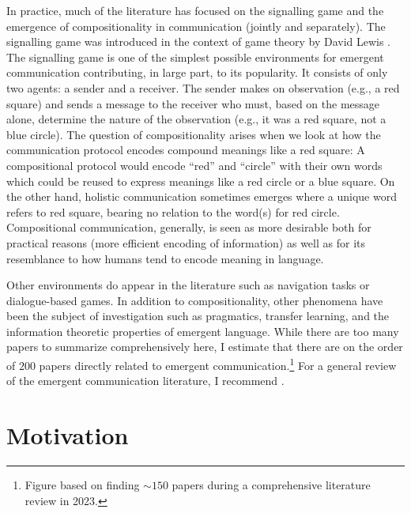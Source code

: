 In practice, much of the literature has focused on the signalling game and the emergence of compositionality in communication (jointly and separately).
The signalling game was introduced in the context of game theory by David Lewis .
The signalling game is one of the simplest possible environments for emergent communication contributing, in large part, to its popularity.
It consists of only two agents: a sender and a receiver.
The sender makes on observation (e.g., a red square) and sends a message to the receiver who must, based on the message alone, determine the nature of the observation (e.g., it was a red square, not a blue circle).
The question of compositionality arises when we look at how the communication protocol encodes compound meanings like a red square: A compositional protocol would encode ``red'' and ``circle'' with their own words which could be reused to express meanings like a red circle or a blue square.
On the other hand, holistic communication sometimes emerges where a unique word refers to red square, bearing no relation to the word(s) for red circle.
Compositional communication, generally, is seen as more desirable both for practical reasons (more efficient encoding of information) as well as for its resemblance to how humans tend to encode meaning in language.

Other environments do appear in the literature such as navigation tasks or dialogue-based games.
In addition to compositionality, other phenomena have been the subject of investigation such as pragmatics, transfer learning, and the information theoretic properties of emergent language.
While there are too many papers to summarize comprehensively here, I estimate that there are on the order of $200$ papers directly related to emergent communication.\footnote{Figure based on finding ${\sim}150$ papers during a comprehensive literature review in 2023.}
For a general review of the emergent communication literature, I recommend .


\section{Motivation}

